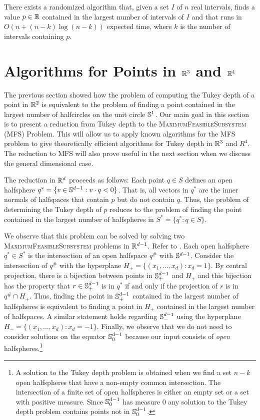 \documentclass[12pt]{article}
\begin{document}
\begin{thm}
There exists a randomized algorithm that, given a set $I$ of $n$ real
intervals, finds a value $p\in\mathbb{R}$ contained in the largest number of
intervals of $I$ and that runs in $O(n+(n-k)\log (n-k))$ expected
time, where $k$ is the number of intervals containing $p$.
\end{thm}


\section{Algorithms for Points in $\mathbb{R}^3$ and $\mathbb{R}^4$}

The previous section showed how the problem of computing the Tukey
depth of a point in $\mathbb{R}^2$ is equivalent to the problem of finding a
point contained in the largest number of halfcircles on the unit
circle $\mathbb{S}^1$.  Our main goal in this section is to present a
reduction from Tukey depth to the \textsc{MaximumFeasibleSubsystem}
(MFS) Problem. This will allow us to apply known algorithms for the
MFS problem to give theoretically efficient algorithms for Tukey depth
in $\mathbb{R}^3$ and $R^4$. The reduction to MFS will also prove useful in the next
section when we discuss the general dimensional case.

The reduction in $\mathbb{R}^d$ proceeds as follows:  Each point $q\in S$
defines an open halfsphere $q^*=\{ v\in\mathbb{S}^{d-1} : v\cdot q < 0\}$.
That is, all vectors in $q^*$ are the inner normals of halfspaces that
contain $p$ but do not contain $q$.  Thus, the problem of determining
the Tukey depth of $p$ reduces to the problem of finding the point
contained in the largest number of halfspheres in $S^*=\{q^* : q\in
S\}$.

We observe that this problem can be solved by solving two
\textsc{MaximumFeasibleSubsystem} problems in $\mathbb{R}^{d-1}$. Refer to
.  Each open halfsphere $q^*\in S^*$ is the
intersection of an open halfspace $q^\#$ with $\mathbb{S}^{d-1}$.  Consider
the intersection of $q^\#$ with the hyperplane
$H_+=\{(x_1,\ldots,x_d):x_d=1\}$.  By central projection, there is a
bijection between points in $\mathbb{S}^{d-1}_+$ and $H_+$ and this bijection
has the property that $r\in\mathbb{S}^{d-1}_+$ is in $q^*$ if and only if the
projection of $r$ is in $q^\#\cap H_+$.  Thus, finding the point in
$\mathbb{S}^{d-1}_+$ contained in the largest number of halfspheres is
equivalent to finding a point in $H_+$ contained in the largest number
of halfspaces.  A similar statement holds regarding $\mathbb{S}^{d-1}_-$
using the hyperplane $H_-=\{(x_1,\ldots,x_d):x_d=-1\}$.  Finally, we
observe that we do not need to consider solutions on the equator
$\mathbb{S}^{d-1}_0$ because our input consists of \emph{open}
halfspheres.\footnote{A solution to the Tukey depth problem is
obtained when we find a set $n-k$ open halfspheres that have a
non-empty common intersection.  The intersection of a finite set of
open halfspheres is either an empty set or a set with positive
measure.  Since $\mathbb{S}^{d-1}_0$ has measure 0 any solution to the Tukey
depth problem contains points not in $\mathbb{S}^{d-1}_0$.}
\end{document}
